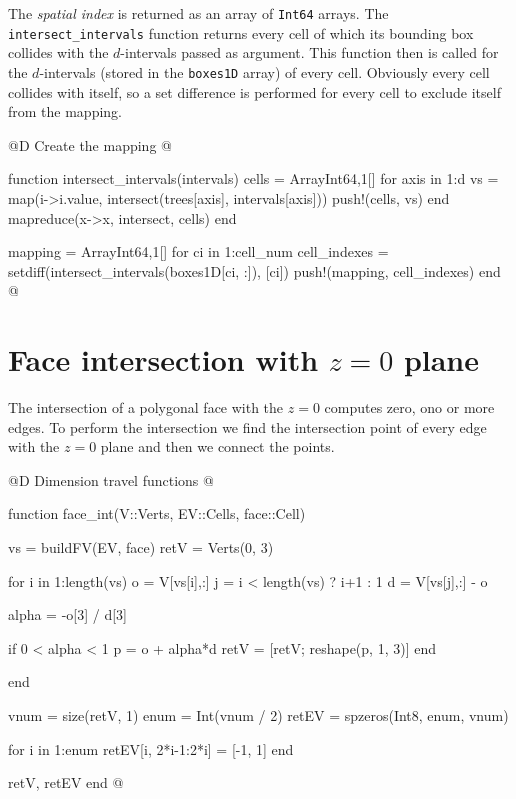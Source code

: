 The \textit{spatial index} is returned as an array of \texttt{Int64} arrays.
The \texttt{intersect\_intervals} function returns every cell of which its bounding box collides with 
the $d$-intervals passed as argument. This function then is called for the $d$-intervals (stored in the \texttt{boxes1D} array) of every cell.
Obviously every cell collides with itself, so a set difference is performed for every cell to exclude itself from the mapping.

@D Create the mapping
@{function intersect_intervals(intervals)
    cells = Array{Int64,1}[]
    for axis in 1:d
        vs = map(i->i.value, intersect(trees[axis], intervals[axis]))
        push!(cells, vs)
    end
    mapreduce(x->x, intersect, cells)
end

mapping = Array{Int64,1}[]
for ci in 1:cell_num
    cell_indexes = setdiff(intersect_intervals(boxes1D[ci, :]), [ci])
    push!(mapping, cell_indexes)
end
@}


\section{Face intersection with $z=0$ plane}

The intersection of a polygonal face with the $z=0$ computes
zero, ono or more edges. To perform the intersection we find the
intersection point of every edge with the $z=0$ plane and then
we connect the points.

@D Dimension travel functions
@{function face_int(V::Verts, EV::Cells, face::Cell)

    vs = buildFV(EV, face)
    retV = Verts(0, 3)

    for i in 1:length(vs)
        o = V[vs[i],:]
        j = i < length(vs) ? i+1 : 1
        d = V[vs[j],:] - o

        alpha = -o[3] / d[3]

        if 0 < alpha < 1
            p = o + alpha*d
            retV = [retV; reshape(p, 1, 3)]
        end

    end

    vnum = size(retV, 1)
    enum = Int(vnum / 2)
    retEV = spzeros(Int8, enum, vnum)

    for i in 1:enum
        retEV[i, 2*i-1:2*i] = [-1, 1]
    end

    retV, retEV
end
@} 
